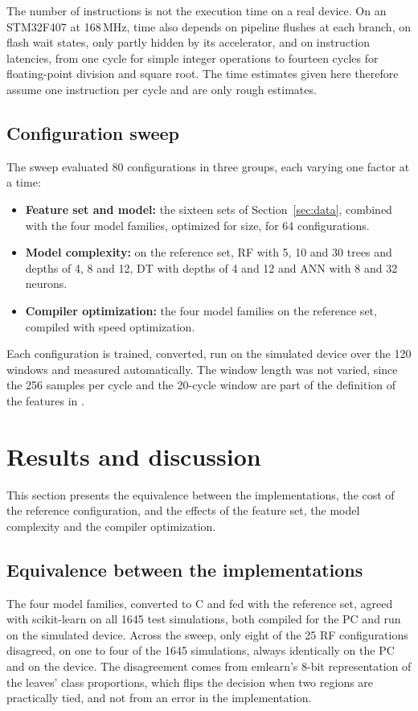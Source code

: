 \documentclass[11pt,a4paper]{article}
\begin{document}
The number of instructions is not the execution time on a real device. On an STM32F407 at 168\,MHz, time also depends on pipeline flushes at each branch, on flash wait states, only partly hidden by its accelerator, and on instruction latencies, from one cycle for simple integer operations to fourteen cycles for floating-point division and square root. The time estimates given here therefore assume one instruction per cycle and are only rough estimates.

\subsection{Configuration sweep}
The sweep evaluated 80 configurations in three groups, each varying one factor at a time:
\begin{itemize}
    \item \textbf{Feature set and model:} the sixteen sets of Section~\ref{sec:data}, combined with the four model families, optimized for size, for 64 configurations.
    \item \textbf{Model complexity:} on the reference set, RF with 5, 10 and 30 trees and depths of 4, 8 and 12, DT with depths of 4 and 12 and ANN with 8 and 32 neurons.
    \item \textbf{Compiler optimization:} the four model families on the reference set, compiled with speed optimization.
\end{itemize}

Each configuration is trained, converted, run on the simulated device over the 120 windows and measured automatically. The window length was not varied, since the 256 samples per cycle and the 20-cycle window are part of the definition of the features in \citet{martins_tcc_en}.

\section{Results and discussion}
This section presents the equivalence between the implementations, the cost of the reference configuration, and the effects of the feature set, the model complexity and the compiler optimization.

\subsection{Equivalence between the implementations}
The four model families, converted to C and fed with the reference set, agreed with scikit-learn on all 1645 test simulations, both compiled for the PC and run on the simulated device. Across the sweep, only eight of the 25 RF configurations disagreed, on one to four of the 1645 simulations, always identically on the PC and on the device. The disagreement comes from emlearn's 8-bit representation of the leaves' class proportions, which flips the decision when two regions are practically tied, and not from an error in the implementation.
\end{document}
